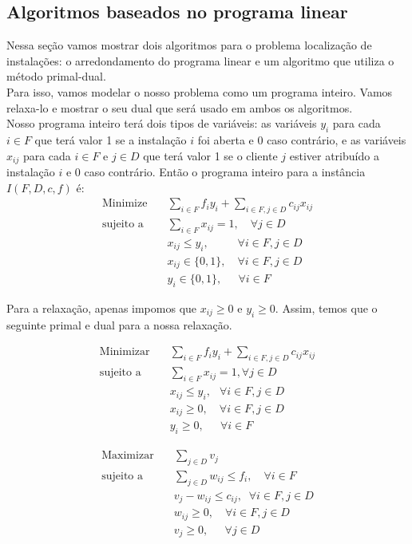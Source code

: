 \documentclass[12pt]{article}
\newcommand{\red}[1]{{\color{red}{#1}}}
\begin{document}
\subsection{Algoritmos baseados no programa linear}
Nessa seção vamos mostrar dois algoritmos para o problema localização de instalações: o arredondamento do programa linear e um algoritmo que utiliza o método primal-dual. \\
Para isso, vamos modelar o nosso problema como um programa inteiro. Vamos relaxa-lo e mostrar o seu dual que será usado em ambos os algoritmos. \\
Nosso programa inteiro terá dois tipos de variáveis: as variáveis $y_i$ para cada $i \in F$ que terá valor 1 se a instalação $i$ foi aberta e 0 caso contrário, e as variáveis $x_{ij}$ para cada $i \in F$ e $j \in D$ que terá valor 1 se o cliente $j$ estiver atribuído a instalação $i$ e 0 caso contrário. Então o programa inteiro para a instância $I(F,D,c,f)$ é:
\begin{align}
 \text{Minimize} \quad & \sum_{i \in F}f_iy_i + \sum_{i\in F,j\in D}c_{ij}x_{ij} \\
 \text{sujeito a} \quad & \sum_{i\in F} x_{ij}=1, \quad \forall j \in D \\
 &x_{ij} \leq y_i,\quad \quad \; \; \forall i\in F,j\in D\\
 &x_{ij} \in \{0,1\} ,\quad \forall i\in F,j\in D\\
 &y_i \in \{0,1\}, \quad \; \,\forall i\in F
\end{align}

Para a relaxação, apenas impomos que $x_{ij} \geq 0$ e $y_i \geq 0$. Assim, temos que o seguinte primal e dual para a nossa relaxação.

\begin{minipage}{0.5\textwidth}
    \[
    \begin{aligned}
        \text{Minimizar} \quad & \sum_{i \in F}f_iy_i + \sum_{i\in F,j\in D}c_{ij}x_{ij} \\
        \text{sujeito a} \quad & \sum_{i\in F} x_{ij}=1,  \forall j \in D \\
        &x_{ij} \leq y_i, \, \; \; \forall i\in F,j\in D\\
        &x_{ij} \geq 0,\quad \forall i\in F,j\in D\\
        &y_i \geq 0, \quad \; \,\forall i\in F
       \end{aligned}
       \]
\end{minipage}%
\begin{minipage}{0.5\textwidth}
    \[
    \begin{aligned}
        \text{Maximizar} \quad & \sum_{j \in D} v_{j} \\
        \text{sujeito a} \quad & \sum_{j\in D} w_{ij}\leq f_i, \quad \forall i \in F \\
        &v_{j} - w_{ij}\leq c_{ij},  \; \; \forall i\in F,j\in D\\
        &w_{ij} \geq 0 ,\quad \forall i\in F,j\in D\\
        &v_j \geq 0, \quad \; \,\forall j\in D
       \end{aligned}
       \]
\end{minipage} \\ \\
\red{Interpretar o dual.}
\newpage
\end{document}
